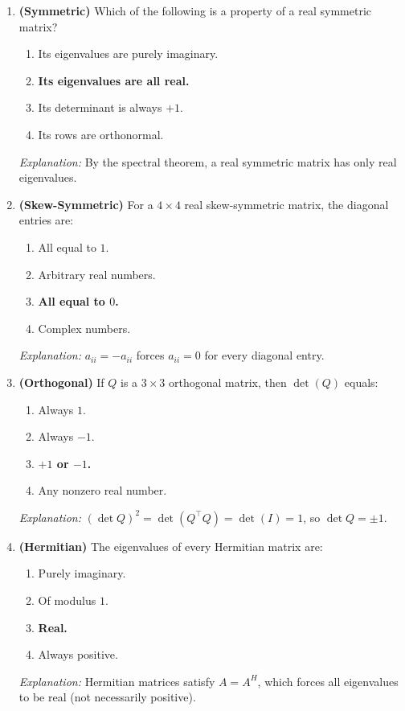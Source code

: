 \documentclass[12pt,a4paper]{article}
\begin{document}
\begin{enumerate}[label=\textbf{MCQ\arabic*.}]
  \item \textbf{(Symmetric)} Which of the following is a property of a real symmetric matrix?
  \begin{enumerate}[label=(\alph*)]
    \item Its eigenvalues are purely imaginary.
    \item \textbf{Its eigenvalues are all real.}
    \item Its determinant is always $+1$.
    \item Its rows are orthonormal.
  \end{enumerate}
  \textit{Explanation:} By the spectral theorem, a real symmetric matrix has only real eigenvalues.

  \item \textbf{(Skew-Symmetric)} For a $4\times 4$ real skew-symmetric matrix, the diagonal entries are:
  \begin{enumerate}[label=(\alph*)]
    \item All equal to $1$.
    \item Arbitrary real numbers.
    \item \textbf{All equal to $0$.}
    \item Complex numbers.
  \end{enumerate}
  \textit{Explanation:} $a_{ii} = -a_{ii}$ forces $a_{ii} = 0$ for every diagonal entry.

  \item \textbf{(Orthogonal)} If $Q$ is a $3\times 3$ orthogonal matrix, then $\det(Q)$ equals:
  \begin{enumerate}[label=(\alph*)]
    \item Always $1$.
    \item Always $-1$.
    \item \textbf{$+1$ or $-1$.}
    \item Any nonzero real number.
  \end{enumerate}
  \textit{Explanation:} $(\det Q)^2 = \det(Q^\top Q) = \det(I) = 1$, so $\det Q = \pm 1$.

  \item \textbf{(Hermitian)} The eigenvalues of every Hermitian matrix are:
  \begin{enumerate}[label=(\alph*)]
    \item Purely imaginary.
    \item Of modulus $1$.
    \item \textbf{Real.}
    \item Always positive.
  \end{enumerate}
  \textit{Explanation:} Hermitian matrices satisfy $A = A^H$, which forces all eigenvalues to be real (not necessarily positive).


\end{enumerate}
\end{document}
